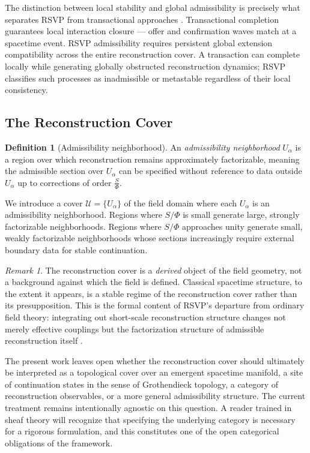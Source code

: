 \documentclass[11pt, a4paper]{article}
\theoremstyle{plain}
\theoremstyle{definition}
\newtheorem{definition}[theorem]{Definition}
\theoremstyle{remark}
\newtheorem{remark}[theorem]{Remark}
\newcommand{\ctrl}{\tfrac{S}{\Phi}}
\newcommand{\cover}{\{U_\alpha\}}
\newcommand{\Ucover}{\mathcal{U}}
\begin{document}
The distinction between local stability and global admissibility is precisely what
separates RSVP from transactional approaches \cite{kastner2024}. Transactional
completion guarantees local interaction closure --- offer and confirmation waves match
at a spacetime event. RSVP admissibility requires persistent global extension
compatibility across the entire reconstruction cover. A transaction can complete
locally while generating globally obstructed reconstruction dynamics; RSVP classifies
such processes as inadmissible or metastable regardless of their local consistency.

\subsection{The Reconstruction Cover}

\begin{definition}[Admissibility neighborhood]
An \emph{admissibility neighborhood} $U_\alpha$ is a region over which
reconstruction remains approximately factorizable, meaning the admissible section
over $U_\alpha$ can be specified without reference to data outside $U_\alpha$ up to
corrections of order $\ctrl$.
\end{definition}

We introduce a cover $\Ucover = \cover$ of the field domain where each $U_\alpha$
is an admissibility neighborhood. Regions where $S/\Phi$ is small generate large,
strongly factorizable neighborhoods. Regions where $S/\Phi$ approaches unity
generate small, weakly factorizable neighborhoods whose sections increasingly require
external boundary data for stable continuation.

\begin{remark}
\label{rem:cover-derived}
The reconstruction cover is a \emph{derived} object of the field geometry, not a
background against which the field is defined. Classical spacetime structure, to the
extent it appears, is a stable regime of the reconstruction cover rather than its
presupposition. This is the formal content of RSVP's departure from ordinary field
theory: integrating out short-scale reconstruction structure changes not merely
effective couplings but the factorization structure of admissible reconstruction
itself \cite{wilson1974,goldenfeld1992}.

The present work leaves open whether the reconstruction cover should ultimately be
interpreted as a topological cover over an emergent spacetime manifold, a site of
continuation states in the sense of Grothendieck topology, a category of
reconstruction observables, or a more general admissibility structure. The current
treatment remains intentionally agnostic on this question. A reader trained in sheaf
theory will recognize that specifying the underlying category is necessary for a
rigorous formulation, and this constitutes one of the open categorical obligations of
the framework.
\end{remark}
\end{document}
